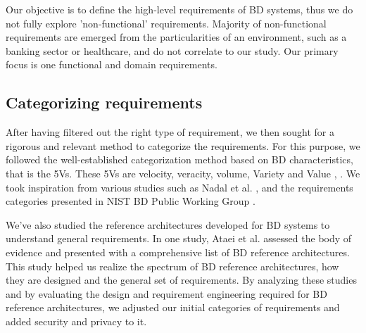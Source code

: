 \documentclass[a4paper,11pt,article,oneside]{memoir}
\begin{document}
Our objective is to define the high-level requirements of BD systems, thus we do not fully explore 'non-functional' requirements. Majority of non-functional requirements are emerged from the particularities of an environment, such as a banking sector or healthcare, and do not correlate to our study. Our primary focus is one functional and domain requirements. 

\subsection{Categorizing requirements} After having filtered out the right type of requirement, we then sought for a rigorous and relevant method to categorize the requirements. For this purpose, we followed the well-established categorization method based on BD characteristics, that is the 5Vs. These 5Vs are velocity, veracity, volume, Variety and Value \cite{Bughin2016}, \cite{rad2017big}. We took inspiration from various studies such as Nadal et al. \cite{nadal2017software}, and the requirements categories presented in NIST BD Public Working Group \cite{Chang.2019}.



We've also studied the reference architectures developed for BD systems to understand general requirements. In one study, Ataei et al. \cite{ataei2020big} assessed the body of evidence and presented with a comprehensive list of BD reference architectures. This study helped us realize the spectrum of BD reference architectures, how they are designed and the general set of requirements. By analyzing these studies and by evaluating the design and requirement engineering required for BD reference architectures, we adjusted our initial categories of requirements and added security and privacy to it. 
\end{document}
